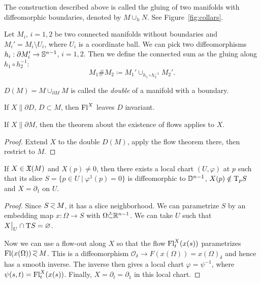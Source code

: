 \begin{defn}
    The construction described above is called the gluing of two manifolds with diffeomorphic boundaries, denoted by $M\cup_h N$. See Figure~\ref{fig:collars}.
\end{defn}

\begin{defn}
    Let $M_i$, $i=1,2$ be two connected manifolds without boundaries and $M_i'=M_i\setminus U_i$, where $U_i$ is a coordinate ball. We can pick two diffeomorphisms $h_i:\partial M_i'\to \mathbb{S}^{n-1}$, $i=1,2$. Then we define the connected sum as the gluing along $h_1\circ h_2^{-1}$:
    \[M_1 \# M_2\coloneqq M_1'\cup_{h_1\circ h_2^{-1}}M_2'.\]
\end{defn}
\begin{example}
    $D(M)=M\cup_{\partial M}M$ is called the \emph{double} of a manifold with a boundary.
\end{example}
\begin{example}
    If $X\parallel \partial D$, $D\subset M$, then $\mathrm{Fl}^X$ leaves $D$ invariant.
\end{example}
\begin{cor}
    If $X\parallel \partial M$, then the theorem about the existence of flows applies to $X$.
\end{cor}
\begin{proof}
    Extend $X$ to the double $D(M)$, apply the flow theorem there, then restrict to $M$.
\end{proof}

\begin{thm}\label{rectification}
If $X\in\mathfrak{X}(M)$ and $X(p)\neq 0$, then there exists a local chart $(U,\varphi)$ at $p$ such that its slice $S=\{p\in U\mid \varphi^1(p)=0\}$ is diffeomorphic to $\mathbb{D}^{n-1}$, $X(p)\notin \mathrm{T}_p S$ and $X=\partial_1$ on $U$.
\end{thm}
\begin{proof}
    Since $S\emb M$, it has a slice neighborhood. We can parametrize $S$ by an embedding map $x:\Omega\to S$ with $\Omega\mathring{\subset}\mathbb{R}^{n-1}$. We can take $U$ such that $\restr{X}{U}\cap \T S=\varnothing$. 

    Now we can use a flow-out along $X$ so that the flow $\mathrm{Fl}^X_t(x(s))$ parametrizes $\Fl(x(\Omega))\emb M$. This is a diffeomorphism $\mathcal{O}_\delta\to F(x(\Omega))=x(\Omega)_\delta$ and hence has a smooth inverse. The inverse then gives a local chart $\varphi=\psi^{-1}$, where $\psi(s,t)=\mathrm{Fl}^X_t(x(s))$. Finally, $X=\partial_t=\partial_1$ in this local chart.
\end{proof}

